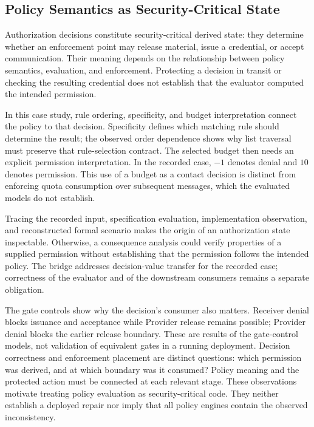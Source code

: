 
\subsection{Policy Semantics as Security-Critical State}

Authorization decisions constitute security-critical derived state: they determine whether
an enforcement point may release material, issue a credential, or accept
communication. Their meaning depends on the relationship between policy
semantics, evaluation, and enforcement. Protecting a decision in transit or
checking the resulting credential does not establish that the evaluator
computed the intended permission.

In this case study, rule ordering, specificity, and budget interpretation
connect the policy to that decision. Specificity defines which matching
rule should determine the result; the observed order dependence shows why
list traversal must preserve that rule-selection contract. The selected
budget then needs an explicit permission interpretation. In the recorded
case, $-1$ denotes denial and $10$ denotes permission. This use of a budget
as a contact decision is distinct from enforcing quota consumption over
subsequent messages, which the evaluated models do not establish.

Tracing the recorded input, specification evaluation,
implementation observation, and reconstructed formal scenario makes the origin of an
authorization state inspectable. Otherwise, a consequence analysis could
verify properties of a supplied permission without establishing that the
permission follows the intended policy. The bridge addresses decision-value
transfer for the recorded case; correctness of the evaluator and of the
downstream consumers remains a separate obligation.

The gate controls show why the decision's consumer also matters. Receiver
denial blocks issuance and acceptance while Provider release remains
possible; Provider denial blocks the earlier release boundary. These are
results of the gate-control models, not validation of equivalent gates in
a running deployment. Decision correctness and enforcement placement are
distinct questions: which permission was derived, and at which boundary
was it consumed? Policy meaning and the protected action must be connected
at each relevant stage.
These observations motivate treating policy evaluation as security-critical
code. They neither establish a deployed repair nor imply that all policy
engines contain the observed inconsistency.

